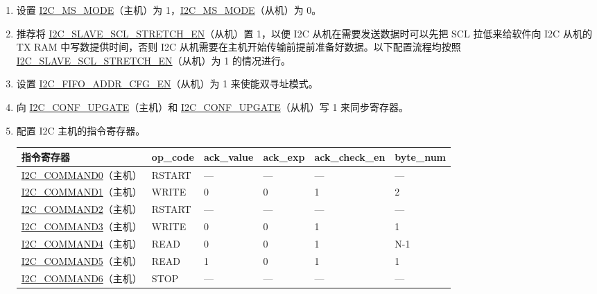 \documentclass[main\_\_CN.tex]{subfiles}
\begin{document}
\begin{enumerate}
\item 设置 \hyperref[fielddesc:I2CMSMODE]{I2C\_MS\_MODE}（主机）为 1，\hyperref[fielddesc:I2CMSMODE]{I2C\_MS\_MODE}（从机）为 0。
\item 推荐将 \hyperref[fielddesc:I2CSLAVESCLSTRETCHEN]{I2C\_SLAVE\_SCL\_STRETCH\_EN}（从机）置 1，以便 I2C 从机在需要发送数据时可以先把 SCL 拉低来给软件向 I2C 从机的 TX RAM 中写数提供时间，否则 I2C 从机需要在主机开始传输前提前准备好数据。以下配置流程均按照\hyperref[fielddesc:I2CSLAVESCLSTRETCHEN]{I2C\_SLAVE\_SCL\_STRETCH\_EN}（从机）为 1 的情况进行。
\item 设置 \hyperref[fielddesc:I2CFIFOADDRCFGEN]{I2C\_FIFO\_ADDR\_CFG\_EN}（从机）为 1 来使能双寻址模式。
\item 向 \hyperref[fielddesc:I2CCONFUPGATE]{I2C\_CONF\_UPGATE}（主机）和 \hyperref[fielddesc:I2CCONFUPGATE]{I2C\_CONF\_UPGATE}（从机）写 1 来同步寄存器。
\item 配置 I2C 主机的指令寄存器。

\begin{longtable}{ | p{4cm} | p{2cm} | p{2cm} | p{2cm} |p{2cm} | p{2cm} |}
\hline\rowcolor{lightgray}
指令寄存器& op\_code & ack\_value&ack\_exp&ack\_check\_en&byte\_num  \\ \hline
\hyperref[fielddesc:I2CCOMMAND0]{I2C\_COMMAND0}（主机）& RSTART& ---&---&---&---  \\ \hline
\hyperref[fielddesc:I2CCOMMAND1]{I2C\_COMMAND1}（主机）& WRITE& 0&0&1&2  \\ \hline
\hyperref[fielddesc:I2CCOMMAND2]{I2C\_COMMAND2}（主机）& RSTART& ---&---&---&---  \\ \hline
\hyperref[fielddesc:I2CCOMMAND3]{I2C\_COMMAND3}（主机）& WRITE& 0&0&1&1  \\ \hline
\hyperref[fielddesc:I2CCOMMAND4]{I2C\_COMMAND4}（主机）& READ& 0&0&1&N-1  \\ \hline
\hyperref[fielddesc:I2CCOMMAND5]{I2C\_COMMAND5}（主机）& READ& 1&0&1&1  \\ \hline
\hyperref[fielddesc:I2CCOMMAND6]{I2C\_COMMAND6}（主机）& STOP& ---&---&---&---  \\ \hline
\end{longtable}


\end{enumerate}
\end{document}
